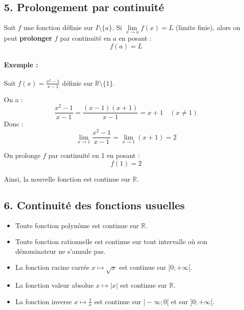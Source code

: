 \documentclass[12pt,a4paper]{article}
\begin{document}
\subsection*{\color{myred}5. Prolongement par continuité}

Soit \( f \) une fonction définie sur \( I \setminus \{a\} \). Si \( \lim\limits_{x \to a} f(x) = L \) (limite finie), alors on peut \textbf{prolonger} \( f \) par continuité en \( a \) en posant :
\[
f(a) = L
\]

\paragraph{Exemple :}
Soit \( f(x) = \frac{x^2 - 1}{x - 1} \) définie sur \( \mathbb{R} \setminus \{1\} \).

On a :
\[
\frac{x^2 - 1}{x - 1} = \frac{(x-1)(x+1)}{x-1} = x+1 \quad (x \neq 1)
\]
Donc :
\[
\lim_{x \to 1} \frac{x^2 - 1}{x - 1} = \lim_{x \to 1} (x+1) = 2
\]

On prolonge \( f \) par continuité en 1 en posant :
\[
f(1) = 2
\]

Ainsi, la nouvelle fonction est continue sur \( \mathbb{R} \).

\subsection*{\color{myred}6. Continuité des fonctions usuelles}

\begin{tcolorbox}[colback=gray!5!white, colframe=black!75!black]
\begin{itemize}
    \item Toute fonction polynôme est continue sur \( \mathbb{R} \).
    \item Toute fonction rationnelle est continue sur tout intervalle où son dénominateur ne s'annule pas.
    \item La fonction racine carrée \( x \mapsto \sqrt{x} \) est continue sur \( [0; +\infty[ \).
    \item La fonction valeur absolue \( x \mapsto |x| \) est continue sur \( \mathbb{R} \).
    \item La fonction inverse \( x \mapsto \frac{1}{x} \) est continue sur \( ]-\infty; 0[ \) et sur \( ]0; +\infty[ \).
\end{itemize}
\end{tcolorbox}
\end{document}
